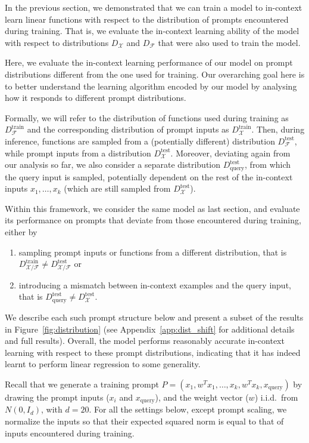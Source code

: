 In the previous section, we demonstrated that we can train a model to in-context learn linear functions with respect to the distribution of prompts encountered during training.
That is,  we evaluate the in-context learning ability of the model with respect to distributions $D_\mathcal{X}$ and $D_\mathcal{F}$ that were also used to train the model.

Here, we evaluate the in-context learning performance of our model on prompt distributions different from the one used for training.
Our overarching goal here is to better understand the learning algorithm encoded by our model by analysing how it responds to different prompt distributions.

Formally, we will refer to the distribution of functions used during training as $D_\mathcal{F}^\text{train}$ and the corresponding distribution of prompt inputs as $D_\mathcal{X}^\text{train}$.
Then, during inference, functions are sampled from a (potentially different) distribution $D_\mathcal{F}^\text{test}$, while prompt inputs from a distribution $D_\mathcal{X}^\text{test}$.
Moreover, deviating again from our analysis so far, we also consider a separate distribution  $D_\text{query}^\text{test}$, from which the query input is sampled, potentially dependent on the rest of the in-context inputs $x_1,\ldots,x_k$ (which are still sampled from   $D_\mathcal{X}^\text{test}$).

Within this framework, we consider the same model as last section, and evaluate its performance on prompts that deviate from those encountered during training, either by
\begin{enumerate}
    \item sampling prompt inputs or functions from a different distribution, that is $D_{\mathcal{X/F}}^\text{train}\neq D_{\mathcal{X/F}}^\text{test}$ or
    \item introducing a mismatch between in-context examples and the query input, that is $D_\text{query}^\text{test} \neq D_\mathcal{X}^\text{test}$.
\end{enumerate}
We describe each such prompt structure below and present a subset of the results in Figure~\ref{fig:distribution} (see Appendix~\ref{app:dist_shift} for additional details and full results). 
Overall, the model performs reasonably accurate in-context learning with respect to these prompt distributions, indicating that it has indeed learnt to perform linear regression to some generality.

Recall that we generate a training prompt $P = (x_1, w^T x_1,   \ldots, x_k, w^T x_k, x_{\text{query}})$ by drawing the prompt inputs ($x_i$ and $x_{\text{query}}$), and the weight vector ($w$) i.i.d.\ from $N(0, I_d)$, with $d = 20$. For all the settings below, except prompt scaling, we normalize the inputs so that their expected squared norm is equal to that of inputs encountered during training. 

